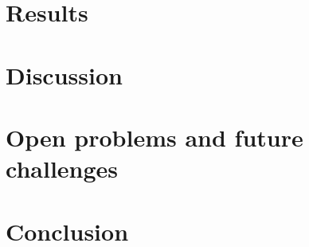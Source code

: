 \documentclass{llncs}
\begin{document}
\section{Results}
\label{sect:results}


\section{Discussion}
\label{sect:discussion}


\section{Open problems and future challenges}
\label{sect:op_fc}


\section{Conclusion}
\label{sect:conclusion}



\newpage



\end{document}
